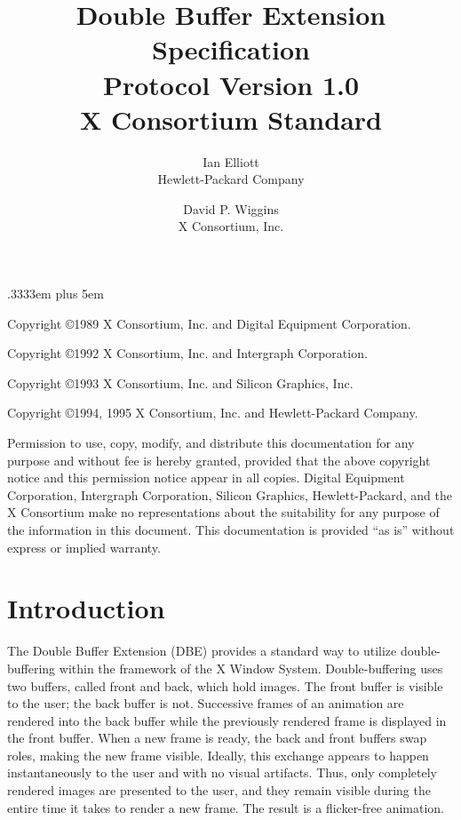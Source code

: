 \spaceskip .3333em plus 5em



\title{Double Buffer Extension Specification\\Protocol Version 1.0\\X Consortium Standard}
\author{Ian Elliott\\Hewlett-Packard Company \and David P. Wiggins\\X Consortium, Inc.}
\maketitle
\thispagestyle{empty}

\eject

Copyright \copyright 1989 X Consortium, Inc. and Digital Equipment Corporation.

Copyright \copyright 1992 X Consortium, Inc. and Intergraph Corporation.

Copyright \copyright 1993 X Consortium, Inc. and Silicon Graphics, Inc.

Copyright \copyright 1994, 1995 X Consortium, Inc. and Hewlett-Packard Company.

Permission to use, copy, modify, and distribute this documentation for
any purpose and without fee is hereby granted, provided that the above
copyright notice and this permission notice appear in all copies.
Digital Equipment Corporation, Intergraph Corporation, Silicon
Graphics, Hewlett-Packard, and the X Consortium make no
representations about the suitability for any purpose of the
information in this document.  This documentation is provided ``as is''
without express or implied warranty.

\eject

\section{Introduction}

The Double Buffer Extension (DBE) provides a standard way to utilize
double-buffering within the framework of the X Window System.
Double-buffering uses two buffers, called front and back, which hold
images.  The front buffer is visible to the user; the back buffer is
not.  Successive frames of an animation are rendered into the back
buffer while the previously rendered frame is displayed in the front
buffer.  When a new frame is ready, the back and front buffers swap
roles, making the new frame visible.  Ideally, this exchange appears to
happen instantaneously to the user and with no visual artifacts.  Thus,
only completely rendered images are presented to the user, and they remain
visible during the entire time it takes to render a new frame.  The
result is a flicker-free animation.

